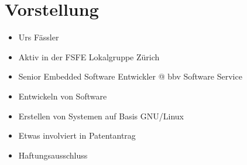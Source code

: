 \section{Vorstellung}
\begin{frame}
	\begin{itemize}
		\item Urs Fässler
		\item Aktiv in der FSFE Lokalgruppe Zürich
		\item Senior Embedded Software Entwickler @ bbv Software Service
		\item Entwickeln von Software
		\item Erstellen von Systemen auf Basis GNU/Linux
		\item Etwas involviert in Patentantrag
	\end{itemize}
\end{frame}

\begin{frame}
	\begin{itemize}
		\item Haftungsausschluss
	\end{itemize}
\end{frame}
